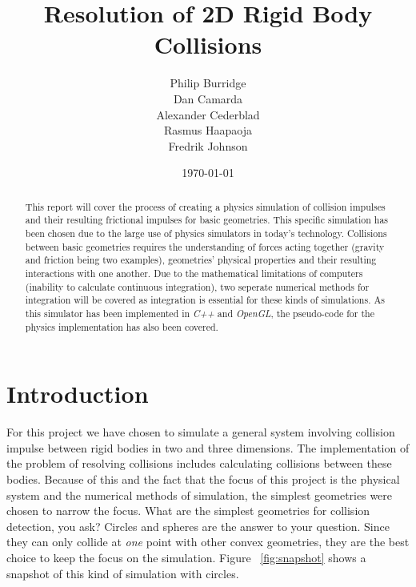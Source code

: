 \documentclass[a4paper,12pt]{report}
\title{Resolution of 2D Rigid Body Collisions}
\author{Philip Burridge\\
        Dan Camarda\\
        Alexander Cederblad\\
        Rasmus Haapaoja\\
        Fredrik Johnson}
\date{\today}
\begin{document}
\maketitle


\begin{abstract}
This report will cover the process of creating a physics simulation of collision impulses and their resulting frictional impulses for basic geometries. This specific simulation has been chosen due to the large use of physics simulators in today's technology. Collisions between basic geometries requires the understanding of forces acting together (gravity and friction being two examples), geometries' physical properties and their resulting interactions with one another. Due to the mathematical limitations of computers (inability to calculate continuous integration), two seperate numerical methods for integration will be covered as integration is essential for these kinds of simulations. As this simulator has been implemented in \emph{C++} and \emph{OpenGL}, the pseudo-code for the physics implementation has also been covered.
\end{abstract}


\tableofcontents
{}


\chapter{Introduction}
\setcounter{page}{1}

For this project we have chosen to simulate a general system involving collision impulse between rigid bodies in two and three dimensions. The implementation of the problem of resolving collisions includes calculating collisions between these bodies. Because of this and the fact that the focus of this project is the physical system and the numerical methods of simulation, the simplest geometries were chosen to narrow the focus. What are the simplest geometries for collision detection, you ask? Circles and spheres are the answer to your question. Since they can only collide at \emph{one} point with other convex geometries, they are the best choice to keep the focus on the simulation. Figure ~\ref{fig:snapshot} shows a snapshot of this kind of simulation with circles.
\end{document}
